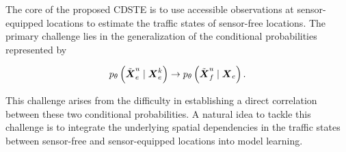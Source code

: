 \documentclass[a4paper,fleqn,12pt]{cas-sc}
\begin{document}
The core of the proposed CDSTE is to use accessible observations at sensor-equipped locations to estimate the traffic states of sensor-free locations. The primary challenge lies in the generalization of the conditional probabilities represented by
\begin{linenomath*}
\begin{equation}
p_{\theta}\left(\Tilde{\boldsymbol{X}}^{u}_{e} \mid \boldsymbol{X}^{k}_{e}\right) \rightarrow p_{\theta}\left(\Tilde{\boldsymbol{X}}^{u}_{f} \mid \boldsymbol{X}_{e}\right).
\end{equation}
\end{linenomath*}
This challenge arises from the difficulty in establishing a direct correlation between these two conditional probabilities. A natural idea to tackle this challenge is to integrate the underlying spatial dependencies in the traffic states between sensor-free and sensor-equipped locations into model learning.
\end{document}
